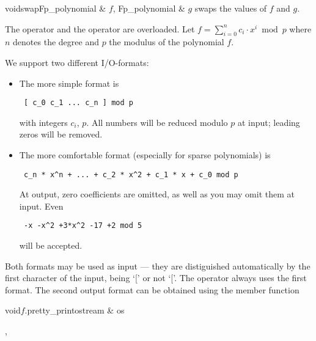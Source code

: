 \begin{fcode}{void}{swap}{Fp_polynomial & $f$, Fp_polynomial & $g$}
  swaps the values of $f$ and $g$.
\end{fcode}



\IO

The  operator \code{>>} and the  operator \code{<<} are overloaded.
Let $f = \sum_{i=0}^{n} c_{i} \cdot x^{i} \bmod p$ where $n$ denotes the degree and $p$ the
modulus of the polynomial $f$.

We support two different I/O-formats:
\begin{itemize}
\item
  The more simple format is
\begin{verbatim} [ c_0 c_1 ... c_n ] mod p \end{verbatim}
with integers $c_i$, $p$.  All numbers will be reduced modulo $p$ at input; leading zeros will
be removed.

\item
  The more comfortable format (especially for sparse polynomials) is
\begin{verbatim} c_n * x^n + ... + c_2 * x^2 + c_1 * x + c_0 mod p
\end{verbatim}
At output, zero coefficients are omitted, as well as you may omit them at input.
Even \begin{verbatim} -x -x^2 +3*x^2 -17 +2 mod 5 \end{verbatim}
will be accepted.
\end{itemize}

Both formats may be used as input --- they are distiguished automatically by the first character
of the input, being `[' or not `['.  The  operator \code{<<} always uses the first
format.  The second output format can be obtained using the member function

\begin{cfcode}{void}{$f$.pretty_print}{ostream & os}
\end{cfcode}



\SEEALSO

, 


